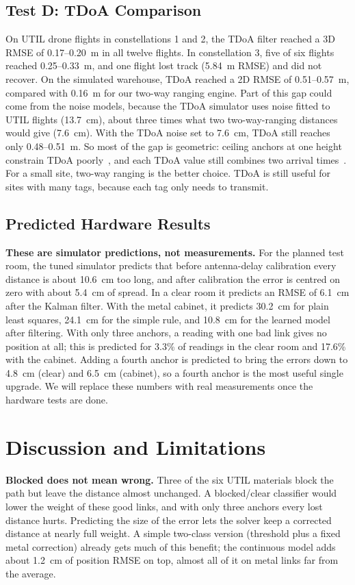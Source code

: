 \documentclass[conference]{IEEEtran}
\begin{document}
\subsection{Test D: TDoA Comparison}
On UTIL drone flights in constellations 1 and 2, the TDoA filter reached a
3D RMSE of 0.17--0.20~m in all twelve flights. In constellation 3, five of
six flights reached 0.25--0.33~m, and one flight lost track (5.84~m RMSE)
and did not recover. On the simulated warehouse, TDoA reached a 2D RMSE of
0.51--0.57~m, compared with 0.16~m for our two-way ranging engine. Part of
this gap could come from the noise models, because the TDoA simulator uses
noise fitted to UTIL flights (13.7~cm), about three times what two
two-way-ranging distances would give (7.6~cm). With the TDoA noise set to
7.6~cm, TDoA still reaches only 0.48--0.51~m. So most of the gap is
geometric: ceiling anchors at one height constrain TDoA
poorly~\cite{torrieri1984statistical}, and each TDoA value still combines
two arrival times~\cite{gezici2005localization}. For a small site,
two-way ranging is the better choice. TDoA is still useful for sites with
many tags, because each tag only needs to transmit.

\subsection{Predicted Hardware Results}
\textbf{These are simulator predictions, not measurements.} For the planned
test room, the tuned simulator predicts that before antenna-delay
calibration every distance is about 10.6~cm too long, and after
calibration the error is centred on zero with about 5.4~cm of spread. In a
clear room it predicts an RMSE of 6.1~cm after the Kalman filter. With the
metal cabinet, it predicts 30.2~cm for plain least squares, 24.1~cm for the
simple rule, and 10.8~cm for the learned model after filtering. With only
three anchors, a reading with one bad link gives no position at all; this
is predicted for 3.3\% of readings in the clear room and 17.6\% with the
cabinet. Adding a fourth anchor is predicted to bring the errors down to
4.8~cm (clear) and 6.5~cm (cabinet), so a fourth anchor is the most useful
single upgrade. We will replace these numbers with real measurements once the
hardware tests are done.

\section{Discussion and Limitations}
\textbf{Blocked does not mean wrong.} Three of the six UTIL materials block
the path but leave the distance almost unchanged. A blocked/clear
classifier would lower the weight of these good links, and with only three
anchors every lost distance hurts. Predicting the size of the error lets
the solver keep a corrected distance at nearly full weight. A simple
two-class version (threshold plus a fixed metal correction) already gets
much of this benefit; the continuous model adds about 1.2~cm of position
RMSE on top, almost all of it on metal links far from the average.
\end{document}
